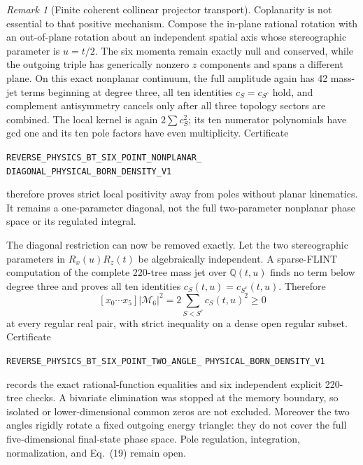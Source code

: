 \documentclass[11pt]{article}
\theoremstyle{definition}
\theoremstyle{remark}
\newtheorem{remark}[theorem]{Remark}
\begin{document}
\begin{remark}[Finite coherent collinear projector transport]
Coplanarity is not essential to that positive mechanism.  Compose the
in-plane rational rotation with an out-of-plane rotation about an independent
spatial axis whose stereographic parameter is $u=t/2$.  The six momenta remain
exactly null and conserved, while the outgoing triple has generically nonzero
$z$ components and spans a different plane.  On this exact nonplanar
continuum, the full amplitude again has 42 mass-jet terms beginning at degree
three, all ten identities $c_S=c_{S^c}$ hold, and complement antisymmetry
cancels only after all three topology sectors are combined.  The local kernel
is again $2\sum c_S^2$; its ten numerator polynomials have gcd one and its ten
pole factors have even multiplicity.  Certificate
\par\noindent
\texttt{REVERSE\_PHYSICS\_BT\_SIX\_POINT\_NONPLANAR\_}
\allowbreak\texttt{DIAGONAL\_PHYSICAL\_BORN\_DENSITY\_V1}
\par\noindent
therefore proves strict local positivity away from poles without planar
kinematics.  It remains a one-parameter diagonal, not the full two-parameter
nonplanar phase space or its regulated integral.

The diagonal restriction can now be removed exactly.  Let the two
stereographic parameters in $R_x(u)R_z(t)$ be algebraically independent.  A
sparse-FLINT computation of the complete 220-tree mass jet over
$\mathbb Q(t,u)$ finds no term below degree three and proves all ten identities
$c_S(t,u)=c_{S^c}(t,u)$.  Therefore
\[
 [x_0\cdots x_5]|\mathcal M_6|^2
 =2\sum_{S<S^c}c_S(t,u)^2\geq0
\]
at every regular real pair, with strict inequality on a dense open regular
subset.  Certificate
\par\noindent
\texttt{REVERSE\_PHYSICS\_BT\_SIX\_POINT\_TWO\_ANGLE\_}
\allowbreak\texttt{PHYSICAL\_BORN\_DENSITY\_V1}
\par\noindent
records the exact rational-function equalities and six independent explicit
220-tree checks.  A bivariate elimination was stopped at the memory boundary,
so isolated or lower-dimensional common zeros are not excluded.  Moreover the
two angles rigidly rotate a fixed outgoing energy triangle: they do not cover
the full five-dimensional final-state phase space.  Pole regulation,
integration, normalization, and Eq.~(19) remain open.


\end{remark}
\end{document}
